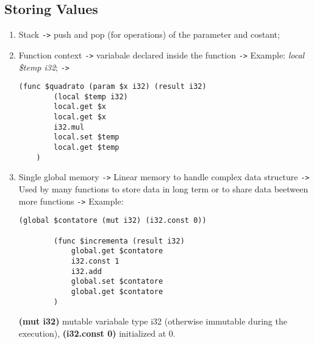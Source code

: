 \subsection{Storing Values}

\begin{enumerate}
    \item Stack \texttt{->} push and pop (for operations) of the parameter and costant;
    \item Function context \texttt{->} variabale declared inside the function \texttt{->} Example: \textit{local \$temp i32}; \texttt{->}
    \begin{lstlisting}[language=wat]
        (func $quadrato (param $x i32) (result i32)
        (local $temp i32)  
        local.get $x       
        local.get $x       
        i32.mul            
        local.set $temp    
        local.get $temp    
    )
\end{lstlisting}
    \item Single global memory \texttt{->} Linear memory to handle complex data structure \texttt{->} Used by many functions to store data in long term or to share data beetween more functions \texttt{->} Example:

    \begin{lstlisting}[language=wat]
        (global $contatore (mut i32) (i32.const 0))  
  
        (func $incrementa (result i32)
            global.get $contatore   
            i32.const 1
            i32.add                 
            global.set $contatore   
            global.get $contatore   
        )
        \end{lstlisting}
    \textbf{(mut i32)} mutable variabale type i32 (otherwise immutable during the execution), \textbf{(i32.const 0)} initialized at 0.

\end{enumerate}


